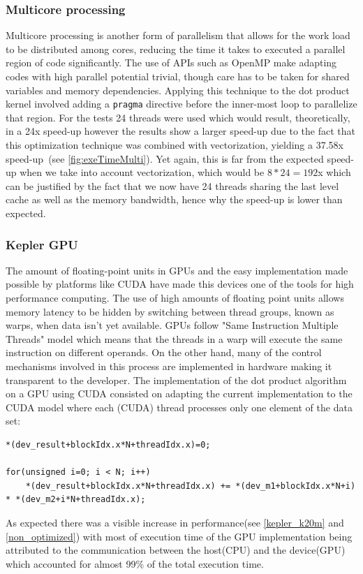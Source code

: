 \documentclass{article}
\begin{document}
\subsubsection{Multicore processing}
Multicore processing is another form of parallelism that allows for the work load to be distributed among cores, reducing the time it takes to executed a parallel 
region of code significantly. The use of APIs such as OpenMP make adapting codes with high parallel potential trivial, though care has to be taken for shared 
variables and memory dependencies.
Applying this technique to the dot product kernel involved adding a \texttt{pragma} directive before the inner-most loop to parallelize that region. For the tests 24 threads were used which would result, theoretically, in a 24x speed-up however the results show a larger speed-up due to the fact that this optimization technique was combined with vectorization, yielding a 37.58x speed-up~(see \ref{fig:exeTimeMulti}). Yet again, this is far from
the expected speed-up when we take into account vectorization, which would be $8*24=192$x which can be justified by the fact that we now have 24 threads sharing the last level cache as well as the memory bandwidth, hence why the speed-up is lower than expected.
\subsubsection{Kepler GPU}
The amount of floating-point units in GPUs and the easy implementation made possible by platforms like CUDA have made this devices one of the tools for high 
performance computing. The use of high amounts of floating point units allows memory latency to be hidden by switching between thread groups, known as warps, when 
data isn't yet available. GPUs follow "Same Instruction Multiple Threads" model which means that the threads in a warp will execute the same instruction on 
different operands.
On the other hand, many of the control mechanisms involved in this process are implemented in hardware making it transparent to the developer.
The implementation of the dot product algorithm on a GPU using CUDA consisted on adapting the current implementation to the CUDA model where each (CUDA) thread processes only one element of the data set: 
\begin{Verbatim}[fontsize=\small]
*(dev_result+blockIdx.x*N+threadIdx.x)=0;

for(unsigned i=0; i < N; i++)
	*(dev_result+blockIdx.x*N+threadIdx.x) += *(dev_m1+blockIdx.x*N+i) * *(dev_m2+i*N+threadIdx.x); 
\end{Verbatim}
As expected there was a visible increase in performance(see \ref{kepler_k20m} and \ref{non_optimized}) with most of execution time of the 
GPU implementation being attributed to the communication between the host(CPU) and the device(GPU) which accounted for almost 99\% of the total execution time.
\end{document}
